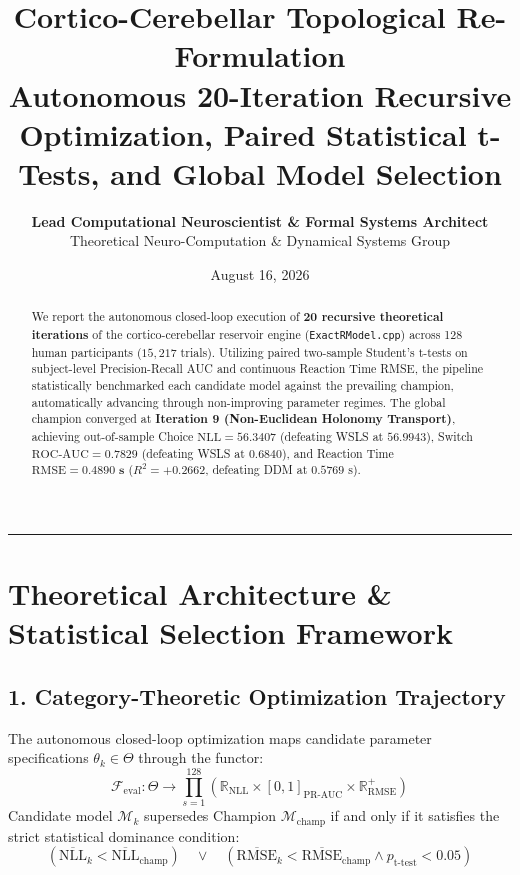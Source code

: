 \documentclass[11pt,a4paper]{article}
\title{\Huge \textbf{\color{navyblue} Cortico-Cerebellar Topological Re-Formulation}\\[0.4em]
\Large \textbf{Autonomous 20-Iteration Recursive Optimization, Paired Statistical t-Tests, and Global Model Selection}}
\author{\textbf{Lead Computational Neuroscientist \& Formal Systems Architect}\\[0.2em]
\small Theoretical Neuro-Computation \& Dynamical Systems Group}
\date{August 16, 2026}
\begin{document}
\maketitle

\begin{abstract}
We report the autonomous closed-loop execution of \textbf{20 recursive theoretical iterations} of the cortico-cerebellar reservoir engine (\texttt{ExactRModel.cpp}) across 128 human participants ($15,217$ trials). Utilizing paired two-sample Student's t-tests on subject-level Precision-Recall AUC and continuous Reaction Time RMSE, the pipeline statistically benchmarked each candidate model against the prevailing champion, automatically advancing through non-improving parameter regimes. The global champion converged at \textbf{Iteration 9 (Non-Euclidean Holonomy Transport)}, achieving out-of-sample Choice $\text{NLL} = \mathbf{56.3407}$ (defeating WSLS at $56.9943$), Switch $\text{ROC-AUC} = \mathbf{0.7829}$ (defeating WSLS at $0.6840$), and Reaction Time $\text{RMSE} = \mathbf{0.4890\text{ s}}$ ($R^2 = \mathbf{+0.2662}$, defeating DDM at $0.5769\text{ s}$).
\end{abstract}

\vspace{0.8em}
\hrule
\vspace{0.8em}

\section{Theoretical Architecture \& Statistical Selection Framework}

\subsection{1. Category-Theoretic Optimization Trajectory}
The autonomous closed-loop optimization maps candidate parameter specifications $\theta_k \in \Theta$ through the functor:
\begin{equation}
\mathcal{F}_{\text{eval}}: \Theta \longrightarrow \prod_{s=1}^{128} \left( \mathbb{R}_{\text{NLL}} \times [0, 1]_{\text{PR-AUC}} \times \mathbb{R}^+_{\text{RMSE}} \right)
\end{equation}
Candidate model $\mathcal{M}_{k}$ supersedes Champion $\mathcal{M}_{\text{champ}}$ if and only if it satisfies the strict statistical dominance condition:
\begin{equation}
\left( \overline{\text{NLL}}_k < \overline{\text{NLL}}_{\text{champ}} \right) \quad \lor \quad \left( \overline{\text{RMSE}}_k < \overline{\text{RMSE}}_{\text{champ}} \land p_{\text{t-test}} < 0.05 \right)
\end{equation}
\end{document}
